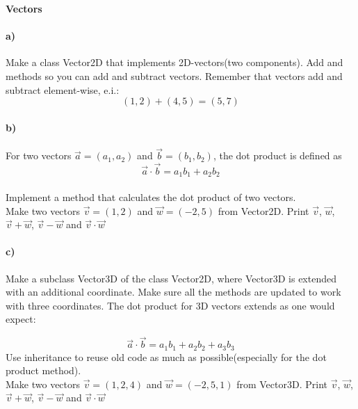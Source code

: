 \begin{Problem}{\textbf{Vectors}} \label{prob93}

\paragraph{a)}

Make a class Vector2D that implements 2D-vectors(two components). Add  and  methods so you can add and subtract vectors. Remember that vectors add and subtract element-wise, e.i.:
\begin{equation*}
    (1,2) + (4,5) = (5,7)
\end{equation*}

\paragraph{b)}
For two vectors $\Vec{a} = (a_1, a_2)$ and $\Vec{b} = (b_1, b_2)$, the dot product is defined as
\begin{equation*}
    \Vec{a} \cdot \Vec{b} = a_1 b_1 + a_2 b_2
\end{equation*}
\\
Implement a method  that calculates the dot product of two vectors.
\\
Make two vectors $\Vec{v}=(1,2)$ and $\Vec{w}=(-2,5)$ from Vector2D. Print $\Vec{v}$, $\Vec{w}$, $\Vec{v}+\Vec{w}$, $\Vec{v}-\Vec{w}$ and $\Vec{v}\cdot \Vec{w}$

\paragraph{c)}
Make a subclass Vector3D of the class Vector2D, where Vector3D is extended with an additional coordinate. Make sure all the methods are updated to work with three coordinates. The dot product for 3D vectors extends as one would expect:

\begin{equation*}
    \Vec{a} \cdot \Vec{b} = a_1 b_1 + a_2 b_2 + a_3 b_3
\end{equation*}
Use inheritance to reuse old code as much as possible(especially for the dot product method).
\\
Make two vectors $\Vec{v}=(1,2,4)$ and $\Vec{w}=(-2,5,1)$ from Vector3D. Print $\Vec{v}$, $\Vec{w}$, $\Vec{v}+\Vec{w}$, $\Vec{v}-\Vec{w}$ and $\Vec{v}\cdot \Vec{w}$


\end{Problem}
